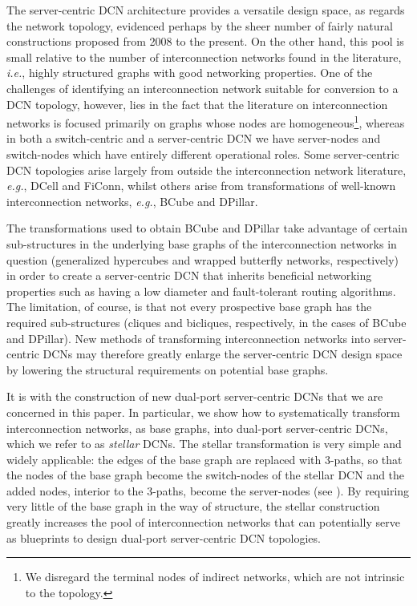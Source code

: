 \documentclass[]{amsart}
\begin{document}
The server-centric DCN architecture provides a versatile design space,
as regards the network topology, evidenced perhaps by the sheer number
of fairly natural constructions proposed from 2008 to the present.  On
the other hand, this pool is small relative to the number of
interconnection networks found in the literature, \emph{i.e.}, highly
structured graphs with good networking properties.  One of the
challenges of identifying an interconnection network suitable for
conversion to a DCN topology, however, lies in the fact that the
literature on interconnection networks is focused primarily on graphs
whose nodes are homogeneous\footnote{We disregard the terminal nodes
  of indirect networks, which are not intrinsic to the topology.}, whereas in both a switch-centric and a server-centric DCN we have server-nodes and switch-nodes which have entirely different operational roles.
Some server-centric DCN topologies arise largely from outside the interconnection network
literature, \emph{e.g.}, DCell and FiConn, whilst others arise from transformations of
well-known interconnection networks, \emph{e.g.}, BCube and DPillar.

The transformations used to obtain BCube and DPillar take advantage of
certain sub-structures in the underlying base graphs of the interconnection networks in question (generalized hypercubes and wrapped butterfly networks, respectively) in order to create a
server-centric DCN that inherits beneficial networking
properties such as having a low diameter and fault-tolerant routing
algorithms.  The limitation, of course, is that not every
prospective base graph has the required sub-structures (cliques and
bicliques, respectively, in the cases of BCube and DPillar).  New methods of
transforming interconnection networks into server-centric DCNs may
therefore greatly enlarge the server-centric DCN design space by lowering the
structural requirements on potential base graphs.

It is with the construction of new dual-port server-centric DCNs that we are
concerned in this paper. In particular, we show how to systematically transform
interconnection networks, as base graphs, into dual-port server-centric DCNs,
which we refer to as \emph{stellar\/} DCNs. The stellar transformation is very
simple and widely applicable: the edges of the base graph are replaced with
3-paths, so that the nodes of the base graph become the switch-nodes of the
stellar DCN and the added nodes, interior to the 3-paths, become the
server-nodes (see ). By requiring very little of the base
graph in the way of structure, the stellar construction greatly increases the
pool of interconnection networks that can potentially serve as blueprints to
design dual-port server-centric DCN topologies.
\end{document}
